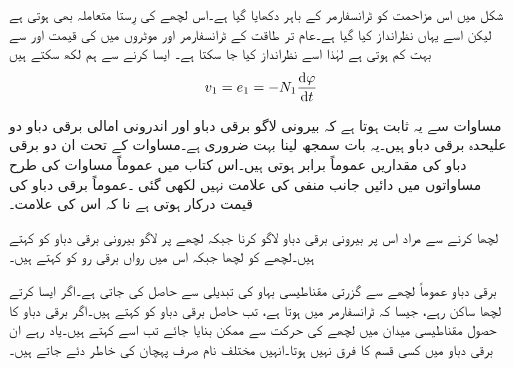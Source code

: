 شکل میں اس مزاحمت کو ٹرانسفارمر کے باہر دکھایا گیا ہے۔اس لچھے کی رِستا متعاملہ بھی ہوتی ہے لیکن اسے یہاں نظرانداز کیا گیا ہے۔عام تر طاقت کے ٹرانسفارمر اور موٹروں  میں  کی قیمت  اور  سے بہت کم ہوتی ہے لہٰذا اسے نظرانداز کیا جا سکتا ہے۔ ایسا کرنے سے ہم لکھ سکتے ہیں 
\begin{align}\label{مساوات_ٹرانسفارمر_بیرونی_اندرونی_دباو_تقریبا_برابر}
v_1 = e_1=-N_1 \frac{\dif \varphi}{\dif t}
\end{align}

مساوات  سے یہ ثابت ہوتا ہے کہ بیرونی لاگو برقی دباو  اور اندرونی امالی برقی دباو  دو علیحدہ برقی دباو ہیں۔یہ بات سمجھ لینا بہت ضروری ہے۔مساوات  کے تحت ان دو برقی دباو کی مقداریں عموماً برابر ہوتی ہیں۔اس کتاب میں عموماً مساوات   کی طرح مساواتوں میں دائیں جانب منفی کی علامت نہیں لکھی گئی ۔عموماً برقی دباو کی قیمت درکار ہوتی ہے نا کہ اس کی علامت۔

لچھا  کرنے سے مراد اس پر بیرونی برقی دباو لاگو کرنا  جبکہ لچھے پر لاگو بیرونی برقی دباو کو   کہتے ہیں۔لچھے  کو  لچھا جبکہ اس میں رواں برقی رو کو  کہتے ہیں۔

برقی دباو عموماً لچھے سے گزرتی مقناطیسی بہاو کی تبدیلی سے حاصل کی جاتی ہے۔اگر ایسا کرتے لچھا ساکن رہے، جیسا کہ ٹرانسفارمر میں ہوتا ہے، تب حاصل برقی دباو کو   کہتے ہیں۔اگر برقی دباو کا حصول مقناطیسی میدان میں لچھے کی حرکت سے ممکن بنایا جائے تب اسے    کہتے ہیں۔یاد رہے ان برقی دباو میں کسی قسم کا فرق نہیں ہوتا۔انہیں مختلف نام صرف پہچان کی خاطر دئے جاتے ہیں۔

